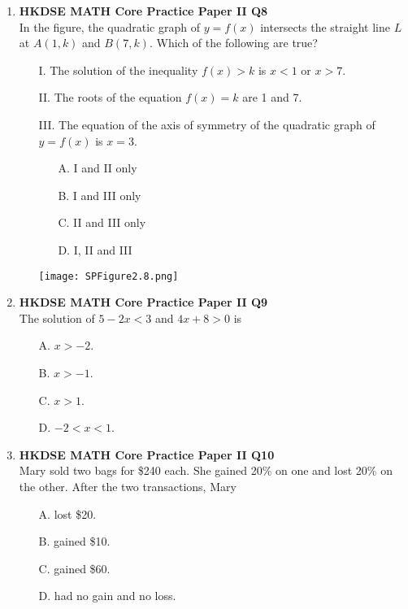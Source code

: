 \documentclass[12pt]{article}
\begin{document}
\begin{enumerate}
	\item \textbf{HKDSE MATH Core Practice Paper II Q8}\\
	In the figure, the quadratic graph of $y = f(x)$ intersects the straight line $L$ at $A(1 , k)$ and $B(7 , k)$. Which of the following are true?
	\begin{enumerate}
		\item[I.] The solution of the inequality $f(x) > k$ is $x < 1$ or $x > 7$.
		\item[II.] The roots of the equation $f(x) = k$ are 1 and 7.
		\item[III.] The equation of the axis of symmetry of the quadratic graph of $y = f(x)$ is $x = 3$.
		\item[]
			\begin{minipage}[u]{.39\textwidth}
				\begin{enumerate}[label=(\Alph*), itemsep=0pt]
					\item[A.] I and II only
					\item[B.] I and III only
					\item[C.] II and III only
					\item[D.] I, II and III
				\end{enumerate}
			\end{minipage}
			\begin{minipage}[u]{.5\textwidth}
				\centering
				\texttt{[image: SPFigure2.8.png]}
			\end{minipage}
	\end{enumerate}
		
	\item \textbf{HKDSE MATH Core Practice Paper II Q9}\\
	The solution of $5 - 2x < 3$ and $4x + 8 > 0$ is 
	\begin{enumerate}
		\item[A.] $x > -2$.
		\item[B.] $x > -1$.
		\item[C.] $x > 1$.
		\item[D.] $-2 < x < 1$.
	\end{enumerate}

	\item \textbf{HKDSE MATH Core Practice Paper II Q10}\\
	Mary sold two bags for \$240 each. She gained 20\% on one and lost 20\% on the other. After the two transactions, Mary
	\begin{enumerate}
		\item[A.] lost \$20.
		\item[B.] gained \$10.
		\item[C.] gained \$60.
		\item[D.] had no gain and no loss.
	\end{enumerate}


\end{enumerate}
\end{document}
